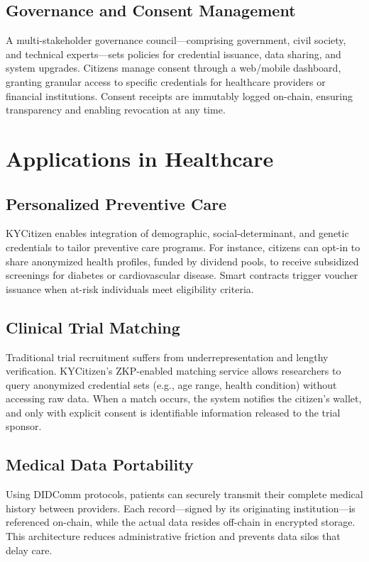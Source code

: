\documentclass[11pt]{article}
\begin{document}
\subsection{Governance and Consent Management}
A multi-stakeholder governance council—comprising government, civil society, and technical experts—sets policies for credential issuance, data sharing, and system upgrades. Citizens manage consent through a web/mobile dashboard, granting granular access to specific credentials for healthcare providers or financial institutions. Consent receipts are immutably logged on-chain, ensuring transparency and enabling revocation at any time.

\section{Applications in Healthcare}
\subsection{Personalized Preventive Care}
KYCitizen enables integration of demographic, social-determinant, and genetic credentials to tailor preventive care programs. For instance, citizens can opt-in to share anonymized health profiles, funded by dividend pools, to receive subsidized screenings for diabetes or cardiovascular disease. Smart contracts trigger voucher issuance when at-risk individuals meet eligibility criteria.

\subsection{Clinical Trial Matching}
Traditional trial recruitment suffers from underrepresentation and lengthy verification. KYCitizen’s ZKP-enabled matching service allows researchers to query anonymized credential sets (e.g., age range, health condition) without accessing raw data. When a match occurs, the system notifies the citizen’s wallet, and only with explicit consent is identifiable information released to the trial sponsor.

\subsection{Medical Data Portability}
Using DIDComm protocols, patients can securely transmit their complete medical history between providers. Each record—signed by its originating institution—is referenced on-chain, while the actual data resides off-chain in encrypted storage. This architecture reduces administrative friction and prevents data silos that delay care.
\end{document}
